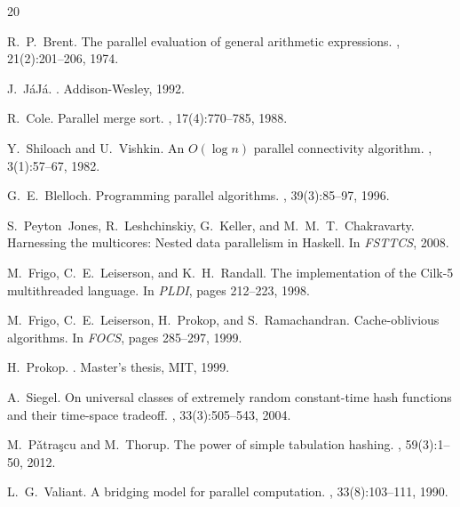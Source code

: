 \documentclass[11pt]{article}
\begin{document}

\begin{thebibliography}{20}

R.~P.~Brent.
\newblock The parallel evaluation of general arithmetic expressions.
, 21(2):201--206, 1974.

J.~J\'aJ\'a.
.
\newblock Addison-Wesley, 1992.

R.~Cole.
\newblock Parallel merge sort.
, 17(4):770--785, 1988.

Y.~Shiloach and U.~Vishkin.
\newblock An {$O(\log n)$} parallel connectivity algorithm.
, 3(1):57--67, 1982.

G.~E.~Blelloch.
\newblock Programming parallel algorithms.
, 39(3):85--97, 1996.

S.~Peyton~Jones, R.~Leshchinskiy, G.~Keller, and M.~M.~T.~Chakravarty.
\newblock Harnessing the multicores: Nested data parallelism in Haskell.
\newblock In {\em FSTTCS}, 2008.

M.~Frigo, C.~E.~Leiserson, and K.~H.~Randall.
\newblock The implementation of the Cilk-5 multithreaded language.
\newblock In {\em PLDI}, pages 212--223, 1998.

M.~Frigo, C.~E.~Leiserson, H.~Prokop, and S.~Ramachandran.
\newblock Cache-oblivious algorithms.
\newblock In {\em FOCS}, pages 285--297, 1999.

H.~Prokop.
.
\newblock Master's thesis, MIT, 1999.

A.~Siegel.
\newblock On universal classes of extremely random constant-time hash
  functions and their time-space tradeoff.
, 33(3):505--543, 2004.

M.~P\v{a}tra\c{s}cu and M.~Thorup.
\newblock The power of simple tabulation hashing.
, 59(3):1--50, 2012.

L.~G.~Valiant.
\newblock A bridging model for parallel computation.
, 33(8):103--111, 1990.


\end{thebibliography}
\end{document}
